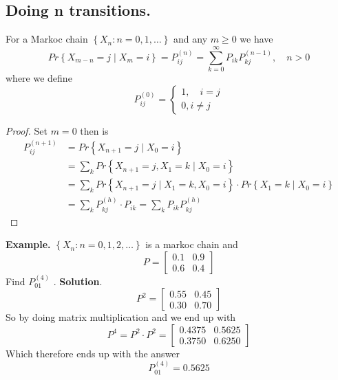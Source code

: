 \documentclass{article}
\theoremstyle{remark}
\begin{document}
 \subsection{Doing n transitions.}%
 \label{sub:doing_n_transitions_}

 \begin{theorem}
   For a Markoc chain $\left\{ X_{n}: n= 0,1, \ldots \right\}$ and any $m\ge 0$ we have \[
     Pr \left \{ X_{m-n} = j  \mid X_{m} = i  \right \}  = P _{ij}^{(n)} =  \sum_{k=0}^{\infty}  P _{ik} P_{kj}^{(n-1)} ,  \quad  n>0
   \]
   where we define \[
   P_{ij}^{(0)} = \begin{cases}
     1 , \quad  i= j \\
     0, i \neq j
   \end{cases}
   \]
 \end{theorem}

 \begin{proof}
   Set $m = 0$ then is \[
   \begin{split}
     P_{ij }^{(n+1)}   & = Pr \left \{ X_{n+1} = j  \mid  X_{0} = i \right \}   \\
     &= \sum_{k}^{}  Pr \left \{ X_{n+1} = j, X_{1} = k  \mid  X_{0} = i \right \}   \\
     &=  \sum_{k}^{} Pr \left \{ X_{n+1} = j  \mid  X_{1} = k, X_{0} = i \right \} \cdot Pr \left \{ X_{1} = k  \mid  X_{0} = i \right \}   \\
     &= \sum_{k}^{} P_{kj}^{(h)} \cdot P_{ik}  = \sum_{k}^{}  P_{ik} P_{kj}^{(h)}
   \end{split}
   \]
 \end{proof}

 \begin{tcolorbox}
   \textbf{Example.} $\left\{ X_{n} : n= 0,1,2, \ldots \right\}$ is a markoc chain and \[
   P = \begin{bmatrix}
   0.1  &  0.9 \\
   0.6  &  0.4
   \end{bmatrix}
   \]
   Find $P_{01}^{(4)}$ .
   \textbf{Solution}. \[
   P^2 = \begin{bmatrix}
   0.55  &  0.45 \\
   0.30  &  0.70
   \end{bmatrix}
   \]
   So by doing matrix multiplication and we end up with \[
   P^{4} = P^{2} \cdot  P^{2} = \begin{bmatrix}
   0.4375  &  0.5625 \\
   0.3750  &  0.6250
   \end{bmatrix}
   \]
   Which therefore ends up with the answer \[
   P_{01}^{(4)} = 0.5625
   \]
 \end{tcolorbox}
\end{document}
